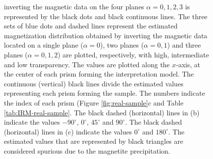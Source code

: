 \documentclass[draft,gc]{agutex}
\begin{document}
\begin{figure}
{ inverting the magnetic data on the four planes $\alpha = 0, 1, 2, 3$
 is represented
 by the black dots and black continuous lines. The three sets of
 blue dots and dashed lines represent the estimated 
 magnetization distribution obtained by inverting the 
 magnetic data located on a single plane ($\alpha = 0$),
 two planes ($\alpha = 0, 1$) and three planes ($\alpha = 0, 1, 2$)
 are plotted, respectively, with high, intermediate and low 
 transparency.
 The values are plotted along the $x$-axis, at the center of each 
 prism forming the interpretation model.
 The continuous (vertical) black lines divide the estimated values 
 representing each prism forming the sample.
 The numbers indicate the index of each prism 
 (Figure \ref{fig:real-sample}c and Table \ref{tab:IRM-real-sample}.
 The black dashed (horizontal) lines in (b) indicate the values 
 $-90^{\circ}$, $0^{\circ}$, $45^{\circ}$ and $90^{\circ}$.
 The black dashed (horizontal) lines in (c) indicate the values 
 $0^{\circ}$ and $180^{\circ}$.
 The estimated values that are represented by black triangles are
 considered spurious due to the magnetite precipitation.}
 \label{fig:estimate-real}
 \end{figure}

%

\clearpage
\end{document}
